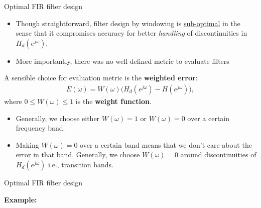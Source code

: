 \documentclass[10pt, handout]{beamer}
\begin{document}
\begin{frame}{Optimal FIR filter design}
\begin{itemize}
	\item Though straightforward, filter design by windowing is \underline{sub-optimal} in the sense that it compromises accuracy for better \textit{handling} of discontinuities in $H_d(e^{j\omega})$.
	\item More importantly, there was no well-defined metric to evaluate filters
\end{itemize}
	\vspace{0.25cm}
	
	A sensible choice for evaluation metric is the \textbf{weighted error}:
	\begin{align*}
		E(\omega) = W(\omega)\Big(H_d(e^{j\omega}) - H(e^{j\omega})\Big), \tag{weighted error}
	\end{align*}
	where $0 \leq W(\omega) \leq 1$ is the \textbf{weight function}. 
	\vspace{0.25cm}
	
	\begin{itemize}
		\item Generally, we choose either $W(\omega) = 1$ or $W(\omega) = 0$ over a certain frequency band.
		\item Making $W(\omega) = 0$ over a certain band means that we don't care about the error in that band. Generally, we choose $W(\omega) = 0$ around discontinuities of $H_d(e^{j\omega})$ i.e., transition bands.
	\end{itemize}	
\end{frame}

\begin{frame}{Optimal FIR filter design}

	\textbf{Example:}
		
	\begin{center}
		\def\CARE{1}
		\resizebox{0.9\linewidth}{!}{}
	\end{center}
\end{frame}
\end{document}
